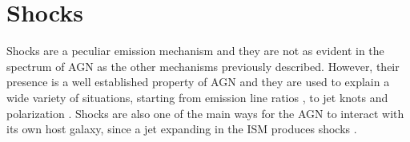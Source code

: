 \documentclass[../main.tex]{subfiles}
\begin{document}
\section{Shocks}
\label{sec:shocks}

Shocks are a peculiar emission mechanism and they are not as evident in the spectrum of AGN as the other mechanisms previously described.
However, their presence is a well established property of AGN \citep[e.g.][]{Dopita95}
and they are used to explain a wide variety of situations, starting from emission line ratios \citep[e.g.][]{Dopita95b,Dopita00,Contini02,Congiu17}, to jet knots and polarization \citep[e.g.][]{Lister05, Beckmann12}.
Shocks are also one of the main ways for the AGN to interact with its own host galaxy, since a jet expanding in the ISM produces shocks \citep{Dopita00,Fragile17}.
\end{document}
